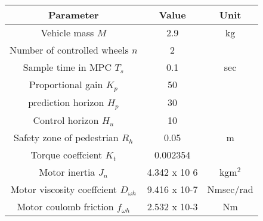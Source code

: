 \begin{tabular}{|c|c|c|}
    \hline
    Parameter                                 & Value        & Unit      \\ \hline
    Vehicle mass $M$                          & 2.9          & kg        \\ \hline
    Number of controlled wheels $n$           & 2            &           \\ \hline
    Sample time in MPC $T_s$                  & 0.1          & sec       \\ \hline
    Proportional gain $K_p$                   & 50           &           \\ \hline
    prediction horizon $H_p$                  & 30           &           \\ \hline
    Control horizon $H_u$                     & 10           &           \\ \hline
    Safety zone of pedestrian $R_h$           & 0.05         & m         \\ \hline
    Torque coeffcient $K_t$                   & 0.002354     &           \\ \hline
    Motor inertia $J_n$                       & 4.342 x 10 6 & kgm$^2$   \\ \hline
    Motor viscosity coeffcient $D_{\omega h}$ & 9.416 x 10-7 & Nmsec/rad \\ \hline
    Motor coulomb friction $f_{\omega h}$     & 2.532 x 10-3 & Nm        \\ \hline
\end{tabular}